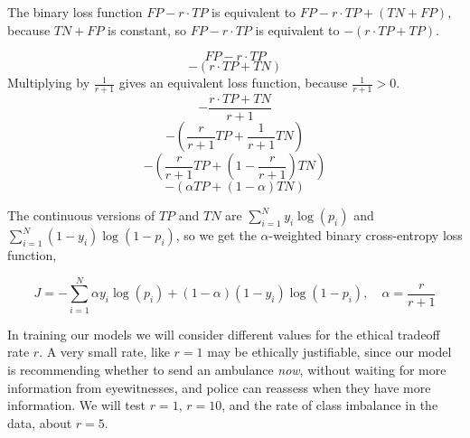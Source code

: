 The binary loss function $FP - r \cdot TP$ is equivalent to $FP - r \cdot TP + (TN+FP)$, because $TN+FP$ is constant, so 
$FP - r \cdot TP$ is equivalent to $-(r \cdot TP+ TP)$.


$$FP - r \cdot TP$$
$$-(r \cdot TP + TN)$$
Multiplying by $\frac{1}{r+1}$ gives an equivalent loss function, because $\frac{1}{r+1}>0$.
$$-\frac{r \cdot TP + TN}{r+1}$$
$$- \left( \frac{r}{r+1} TP + \frac{1}{r+1} TN\right)$$
$$- \left( \frac{r}{r+1} TP + \left( 1 - \frac{r}{r+1} \right) TN \right)$$
$$- (\alpha TP + (1 - \alpha) TN) $$

The continuous versions of $TP$ and $TN$ are 
$ \displaystyle \sum_{i=1}^N y_i \log( p_i)$
and
$ \displaystyle \sum_{i=1}^N (1-y_i) \log( 1 - p_i)$, so we get the $\alpha$-weighted binary cross-entropy loss function, 

$$J = -\sum_{i=1}^N \alpha y_i \log( p_i) + (1-\alpha)(1-y_i) \log( 1 - p_i), \quad \alpha = \frac{r}{r+1}$$

In training our models we will consider different values for the ethical tradeoff rate $r$.  A very small rate, like $r=1$ may be ethically justifiable, since our model is recommending whether to send an ambulance {\it now}, without waiting for more information from eyewitnesses, and police can reassess when they have more information.  We will test $r=1$, $r=10$, and the rate of class imbalance in the data, about $r=5$.  

